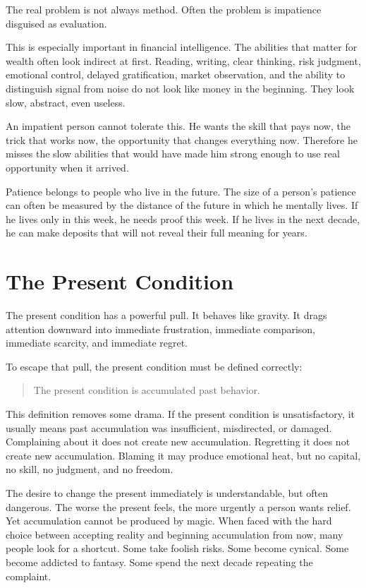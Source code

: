 The real problem is not always method. Often the problem is impatience disguised as evaluation.

This is especially important in financial intelligence. The abilities that matter for wealth often look indirect at first. Reading, writing, clear thinking, risk judgment, emotional control, delayed gratification, market observation, and the ability to distinguish signal from noise do not look like money in the beginning. They look slow, abstract, even useless.

An impatient person cannot tolerate this. He wants the skill that pays now, the trick that works now, the opportunity that changes everything now. Therefore he misses the slow abilities that would have made him strong enough to use real opportunity when it arrived.

Patience belongs to people who live in the future. The size of a person's patience can often be measured by the distance of the future in which he mentally lives. If he lives only in this week, he needs proof this week. If he lives in the next decade, he can make deposits that will not reveal their full meaning for years.

\section*{The Present Condition}

The present condition has a powerful pull. It behaves like gravity. It drags attention downward into immediate frustration, immediate comparison, immediate scarcity, and immediate regret.

To escape that pull, the present condition must be defined correctly:

\begin{quote}
The present condition is accumulated past behavior.
\end{quote}

This definition removes some drama. If the present condition is unsatisfactory, it usually means past accumulation was insufficient, misdirected, or damaged. Complaining about it does not create new accumulation. Regretting it does not create new accumulation. Blaming it may produce emotional heat, but no capital, no skill, no judgment, and no freedom.

The desire to change the present immediately is understandable, but often dangerous. The worse the present feels, the more urgently a person wants relief. Yet accumulation cannot be produced by magic. When faced with the hard choice between accepting reality and beginning accumulation from now, many people look for a shortcut. Some take foolish risks. Some become cynical. Some become addicted to fantasy. Some spend the next decade repeating the complaint.


